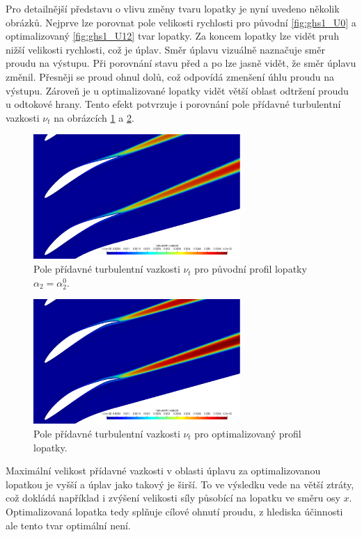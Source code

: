 Pro detailnější představu o vlivu změny tvaru lopatky je nyní uvedeno několik obrázků.
Nejprve lze porovnat pole velikosti rychlosti pro původní \ref{fig:ghs1_U0} a optimalizovaný \ref{fig:ghs1_U12} tvar lopatky. 
Za koncem lopatky lze vidět pruh nižší velikosti rychlosti, což je úplav. Směr úplavu vizuálně naznačuje směr proudu na výstupu. Při porovnání stavu před a po lze jasně vidět, že směr úplavu změnil. Přesněji se proud ohnul dolů, což odpovídá zmenšení úhlu proudu na výstupu. Zároveň je u optimalizované lopatky vidět větší oblast odtržení proudu u odtokové hrany. Tento efekt potvrzuje i porovnání pole přídavné turbulentní vazkosti $ \nu_t $ na obrázcích \ref{fig:ghs1_nut0} a \ref{fig:ghs1_nut12}. 
\begin{figure}[h]
	\includegraphics[width=0.7\textwidth]{img/nut_0.png}
	\caption[Turbulentní vazkost pro původní lopatku]{Pole přídavné turbulentní vazkosti $ \nu_t $ pro původní profil lopatky $ \alpha_{2}=\alpha_2^0 $.}
	\label{fig:ghs1_nut0}
\end{figure}
\begin{figure}[h]
	\includegraphics[width=0.7\textwidth]{img/nut_12.png}
	\caption[Turbulentní vazkost pro optimalizovanou lopatku]{Pole přídavné turbulentní vazkosti $ \nu_t $ pro optimalizovaný profil lopatky.}
	\label{fig:ghs1_nut12}
\end{figure}
Maximální velikost přídavné vazkosti v oblasti úplavu za optimalizovanou lopatkou je vyšší a úplav jako takový je širší. To ve výsledku vede na větší ztráty, což dokládá například i zvýšení velikosti síly působící na lopatku ve směru osy $ x $. Optimalizovaná lopatka tedy splňuje cílové ohnutí proudu, z hlediska účinnosti ale tento tvar optimální není.
